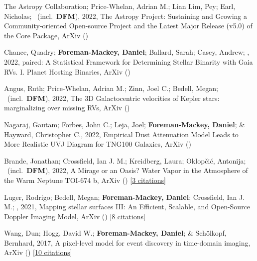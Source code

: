 \item[{\color{numcolor}\scriptsize10}] The Astropy Collaboration; Price-Whelan, Adrian M.; Lian Lim, Pey; Earl, Nicholas; \etal\ (incl.\ \textbf{DFM}), 2022, The Astropy Project: Sustaining and Growing a Community-oriented Open-source Project and the Latest Major Release (v5.0) of the Core Package, ArXiv ()

\item[{\color{numcolor}\scriptsize9}] Chance, Quadry; \textbf{Foreman-Mackey, Daniel}; Ballard, Sarah; Casey, Andrew; \etal, 2022, paired: A Statistical Framework for Determining Stellar Binarity with Gaia RVs. I. Planet Hosting Binaries, ArXiv ()

\item[{\color{numcolor}\scriptsize8}] Angus, Ruth; Price-Whelan, Adrian M.; Zinn, Joel C.; Bedell, Megan; \etal\ (incl.\ \textbf{DFM}), 2022, The 3D Galactocentric velocities of Kepler stars: marginalizing over missing RVs, ArXiv ()

\item[{\color{numcolor}\scriptsize7}] Nagaraj, Gautam; Forbes, John C.; Leja, Joel; \textbf{Foreman-Mackey, Daniel}; \& Hayward, Christopher C., 2022, Empirical Dust Attenuation Model Leads to More Realistic UVJ Diagram for TNG100 Galaxies, ArXiv ()

\item[{\color{numcolor}\scriptsize6}] Brande, Jonathan; Crossfield, Ian J. M.; Kreidberg, Laura; Oklop{\v{c}}i{\'c}, Antonija; \etal\ (incl.\ \textbf{DFM}), 2022, A Mirage or an Oasis? Water Vapor in the Atmosphere of the Warm Neptune TOI-674 b, ArXiv () [\href{https://ui.adsabs.harvard.edu/abs/2022arXiv220104197B}{3 citations}]

\item[{\color{numcolor}\scriptsize5}] Luger, Rodrigo; Bedell, Megan; \textbf{Foreman-Mackey, Daniel}; Crossfield, Ian J. M.; \etal, 2021, Mapping stellar surfaces III: An Efficient, Scalable, and Open-Source Doppler Imaging Model, ArXiv () [\href{https://ui.adsabs.harvard.edu/abs/2021arXiv211006271L}{8 citations}]

\item[{\color{numcolor}\scriptsize4}] Wang, Dun; Hogg, David W.; \textbf{Foreman-Mackey, Daniel}; \& Sch{\"o}lkopf, Bernhard, 2017, A pixel-level model for event discovery in time-domain imaging, ArXiv () [\href{https://ui.adsabs.harvard.edu/abs/2017arXiv171002428W}{10 citations}]


